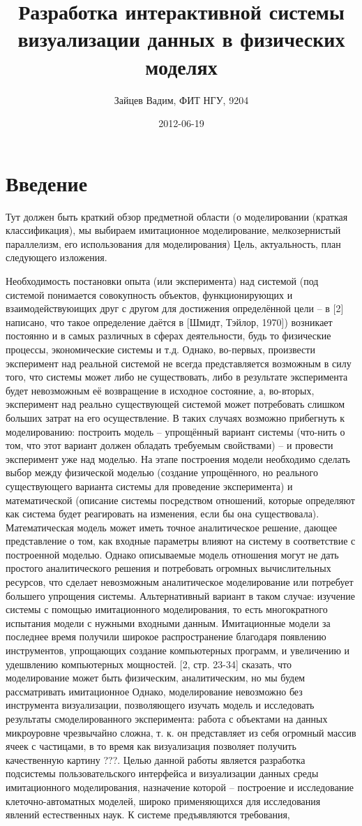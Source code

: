 \documentclass[a4paper,12pt]{extarticle}
\date{2012-06-19}
\title{Разработка интерактивной системы визуализации данных в физических моделях}
\author{Зайцев Вадим, ФИТ НГУ, 9204}
\let\stdsection\section
\renewcommand\section{\newpage\stdsection}
\begin{document}
\section{Введение}
Тут должен быть краткий обзор предметной области (о моделировании (краткая классификация), мы выбираем имитационное моделирование, мелкозернистый параллелизм, его использования для моделирования)
Цель, актуальность, план следующего изложения.

Необходимость постановки опыта (или эксперимента) над системой (под системой понимается совокупность объектов, функционирующих и взаимодействуюищих друг с другом для достижения определённой цели – в [2] написано, что такое определение даётся в [Шмидт, Тэйлор, 1970]) возникает постоянно и в самых различных в сферах деятельности, будь то физические процессы, экономические системы и т.д. Однако, во-первых, произвести эксперимент над реальной системой не всегда представляется возможным в силу того, что системы может либо не существовать, либо в результате эксперимента будет невозможным её возвращение в исходное состояние, а, во-вторых, эксперимент над реально существующей системой может потребовать слишком больших затрат на его осуществление. В таких случаях возможно прибегнуть к моделированию: построить модель – упрощённый вариант системы (что-нить о том, что этот вариант должен обладать требуемым свойствами) – и провести эксперимент уже над моделью. На этапе построения модели необходимо сделать выбор между физической моделью (создание упрощённого, но реального существующего варианта системы для проведение эксперимента) и математической (описание системы посредством отношений, которые определяют как система будет реагировать на изменения, если бы она существовала). Математическая модель может иметь точное аналитическое решение, дающее представление о том, как входные параметры влияют на систему в соответствие с построенной моделью. Однако описываемые модель отношения могут не дать простого аналитического решения и потребовать огромных вычислительных ресурсов, что сделает невозможным аналитическое моделирование или потребует большего упрощения системы. Альтернативный вариант в таком случае: изучение системы с помощью имитационного моделирования, то есть многократного испытания модели с нужными входными данным. Имитационные модели за последнее время получили широкое распространение благодаря появлению инструментов, упрощающих создание компьютерных программ, и увеличению и удешвлению компьютерных мощностей.  [2, стр. 23-34]
сказать, что моделирование может быть физическим, аналитическим, но мы будем рассматривать имитационное
Однако, моделирование невозможно без инструмента визуализации, позволяющего изучать модель и исследовать результаты смоделированного эксперимента: работа с объектами на данных микроуровне чрезвычайно сложна, т. к. он представляет из себя огромный массив ячеек с частицами, в то время как визуализация позволяет получить качественную картину ???. Целью данной работы является разработка подсистемы пользовательского интерфейса и визуализации данных среды имитационного моделирования, назначение которой – построение и исследование клеточно-автоматных моделей, широко применяющихся для исследования явлений естественных наук. К системе предъявляются требования, 
\end{document}
